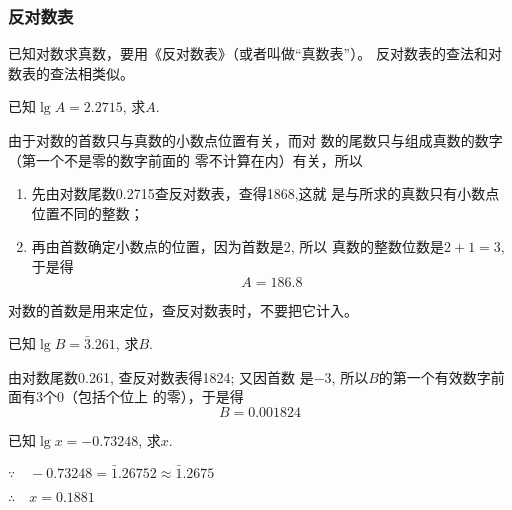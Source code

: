 \subsubsection{反对数表}
已知对数求真数，要用《反对数表》（或者叫做“真数表”）。
反对数表的查法和对数表的查法相类似。



    



\begin{example}
    已知$\lg A=2.2715$, 求$A$.
\end{example}

\begin{solution}
    由于对数的首数只与真数的小数点位置有关，而对
数的尾数只与组成真数的数字（第一个不是零的数字前面的
零不计算在内）有关，所以
\begin{enumerate}
    \item 先由对数尾数0.2715查反对数表，查得1868,这就
    是与所求的真数只有小数点位置不同的整数；
    \item 再由首数确定小数点的位置，因为首数是2, 所以
    真数的整数位数是$2+1=3$, 于是得
    $$A=186.8$$
\end{enumerate}
\end{solution}    

\begin{rmk}
    对数的首数是用来定位，查反对数表时，不要把它计入。
\end{rmk}


\begin{example}
   已知$\lg B=\bar{3}.261$, 求$B$. 
\end{example}

\begin{solution}
由对数尾数0.261, 查反对数表得1824; 又因首数
    是$-3$, 所以$B$的第一个有效数字前面有3个0（包括个位上
    的零），于是得
    \[B=0.001824\]
\end{solution}    

\begin{example}
    已知$\lg x=-0.73248$, 求$x$.
\end{example}

\begin{solution}
$\because\quad -0.73248=\bar{1}.26752\approx \bar{1}.2675$

$\therefore\quad x=0.1881$
\end{solution}  

